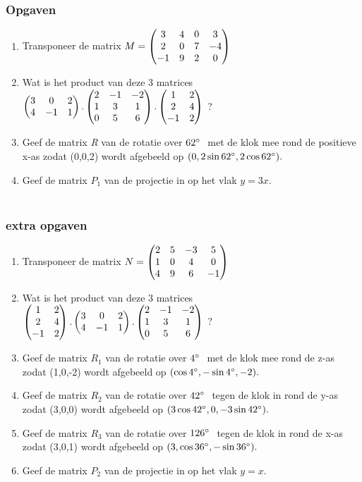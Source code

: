 \subsubsection{Opgaven}
\begin{enumerate}
	\item Transponeer de matrix 
	$ M = \begin{pmatrix}  3 & 4 & 0 &  3 \\  2 &  0 & 7 & -4 \\ -1 & 9 & 2 & 0  \end{pmatrix} $
	
	\item Wat is het product van deze  3 matrices
	$ \begin{pmatrix}  3 & 0 & 2  \\  4 &  -1 & 1 \end{pmatrix} .
	\begin{pmatrix}  2 & -1 & -2  \\  1 &  3 & 1  \\ 0 & 5 & 6  \end{pmatrix}  . 
	\begin{pmatrix}  1 & 2  \\  2 &  4  \\ -1 & 2  \end{pmatrix} $	?
	
	\item Geef de matrix  \textit{R } van de rotatie over $ 62\degree \ $ met de klok mee rond de positieve x-as zodat (0,0,2) wordt afgebeeld op $ (0, 2\sin 62\degree , 2\cos 62\degree ). $ 
	
	\item Geef de matrix  \textit{$ P_1 $} van de projectie  in \RD op het vlak $  y=3x $. \\ \\
	
\end{enumerate}

\subsubsection{extra opgaven}
\begin{enumerate}
	\item  Transponeer de matrix 
	$ N = \begin{pmatrix}  2 & 5 & -3 &  5 \\  1 &  0 & 4 & 0 \\ 4 & 9 & 6 & -1  \end{pmatrix}$
	
	\item Wat is het product van deze  3 matrices
	$ \begin{pmatrix}  1 & 2  \\  2 &  4 \\  -1 & 2  \end{pmatrix} .
	\begin{pmatrix}  3 & 0 & 2  \\  4 &  -1 & 1  \end{pmatrix}  . 
	\begin{pmatrix}   2 & -1 & -2  \\  1 &  3 & 1  \\ 0 & 5 & 6   \end{pmatrix} $	?
	
	\item Geef de matrix  \textit{$ R_1  $} van de rotatie over $ 4\degree \  $  met de klok mee rond de  z-as zodat (1,0,-2) wordt afgebeeld op $ (\cos 4\degree , -\sin 4\degree , -2) . $ 
	
	\item Geef de matrix  \textit{$ R_2 $} van de rotatie over $ 42\degree \  $ tegen de klok in rond de  y-as zodat (3,0,0) wordt afgebeeld op $ (3\cos 42\degree , 0,  -3\sin 42\degree ). $ 
	
	\item Geef de matrix  \textit{$ R_3 $} van de rotatie over $ 126\degree \  $ tegen de klok in rond de  x-as zodat (3,0,1) wordt afgebeeld op $ (3, \cos 36\degree ,  -\sin 36\degree ). $ 
	
	\item Geef de matrix  \textit{$ P_2 $} van de projectie  in \RD op het vlak $  y=x $.
\end{enumerate}

